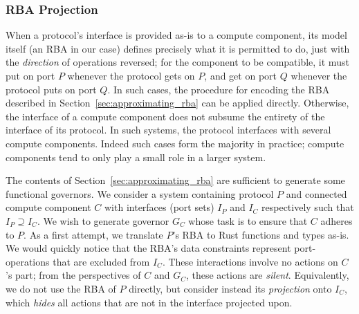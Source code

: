 %




\subsubsection{RBA Projection}
\label{sec:rba_projection}
When a protocol's interface is provided as-is to a compute component, its model itself (an RBA in our case) defines precisely what it is permitted to do, just with the \textit{direction} of operations reversed; for the component to be compatible, it must put on port $P$ whenever the protocol gets on $P$, and get on port $Q$ whenever the protocol puts on port $Q$. In such cases, the procedure for encoding the RBA described in Section~\ref{sec:approximating_rba} can be applied directly. Otherwise, the interface of a compute component does not subsume the entirety of the interface of its protocol. In such systems, the protocol interfaces with several compute components. Indeed such cases form the majority in practice; compute components tend to only play a small role in a larger system.

The contents of Section~\ref{sec:approximating_rba} are sufficient to generate some functional governors. We consider a system containing protocol $P$ and connected compute component $C$ with interfaces (port sets) $I_P$ and $I_C$ respectively such that $I_P \supseteq{} I_C$. We wish to generate governor $G_C$ whose task is to ensure that $C$ adheres to $P$. As a first attempt, we translate $P$'s RBA to Rust functions and types as-is. We would quickly notice that the RBA's data constraints represent port-operations that are excluded from $I_C$. These interactions involve no actions on $C$'s part; from the perspectives of $C$ and $G_C$, these actions are \textit{silent}. Equivalently, we do not use the RBA of $P$ directly, but consider instead its \textit{projection} onto $I_C$, which \textit{hides} all actions that are not in the interface projected upon. 


